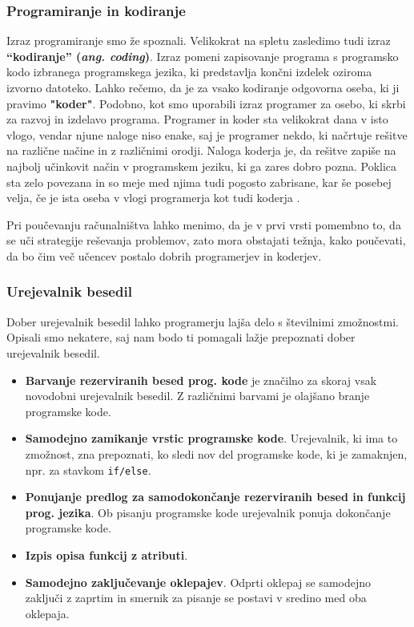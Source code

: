 \subsubsection{Programiranje in kodiranje}
\label{sec:programiranje_kodiranje}

Izraz programiranje smo že spoznali. Velikokrat na spletu zasledimo
tudi izraz \textbf{``kodiranje'' (\emph{ang. coding})}. Izraz pomeni
zapisovanje programa s programsko kodo izbranega programskega jezika,
ki predstavlja končni izdelek oziroma izvorno datoteko. Lahko rečemo,
da je za vsako kodiranje odgovorna oseba, ki ji pravimo
\textbf{"koder"}. Podobno, kot smo uporabili izraz programer za osebo,
ki skrbi za razvoj in izdelavo programa. Programer in koder sta velikokrat dana v isto vlogo, vendar njune naloge niso enake, saj je
programer nekdo, ki načrtuje rešitve na različne načine in z
različnimi orodji. Naloga koderja je, da rešitve zapiše na najbolj
učinkovit način v programskem jeziku, ki ga zares dobro
pozna. Poklica sta zelo povezana in so meje med njima
tudi pogosto zabrisane, kar še posebej velja, če je ista oseba v vlogi
programerja kot tudi koderja \cite{web:coder}.

Pri poučevanju računalništva lahko menimo, da je v prvi vrsti
pomembno to, da se uči strategije reševanja problemov, zato mora
obstajati težnja, kako poučevati, da bo čim več učencev postalo dobrih
programerjev in koderjev.

\subsubsection{Urejevalnik besedil}
\label{sec:urejevalnik_besedil}

Dober urejevalnik besedil lahko programerju lajša delo s številnimi
zmožnostmi. Opisali smo nekatere, saj nam bodo ti pomagali lažje
prepoznati dober urejevalnik besedil.


\begin{itemize}
\item \textbf{Barvanje rezerviranih besed prog. kode} je značilno za
  skoraj vsak novodobni urejevalnik besedil. Z različnimi barvami je
  olajšano branje programske kode.
\item \textbf{Samodejno zamikanje vrstic programske
    kode}. Urejevalnik, ki ima to zmožnost, zna prepoznati, ko sledi
  nov del programske kode, ki je zamaknjen, npr. za stavkom
  \texttt{if/else}.
\item \textbf{Ponujanje predlog za samodokončanje rezerviranih
    besed in funkcij prog. jezika}. Ob pisanju programske kode
  urejevalnik ponuja dokončanje programske kode.
\item \textbf{Izpis opisa funkcij z atributi}. 
\item \textbf{Samodejno zaključevanje oklepajev}. Odprti oklepaj se
  samodejno zaključi z zaprtim in smernik za pisanje se postavi v
  sredino med oba oklepaja. 
\end{itemize}


